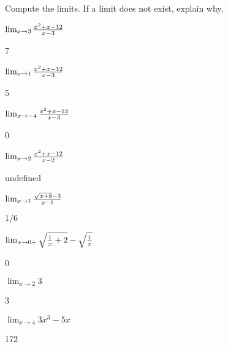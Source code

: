 \begin{exercises}

\noindent Compute the limits. If a limit does not exist, explain why.

\twocol

\begin{exercise} $\lim_{x\to 3}{x^2+x-12\over x-3}$
\begin{answer} 7
\end{answer}\end{exercise}

\begin{exercise} $\lim_{x\to 1}{x^2+x-12\over x-3}$
\begin{answer} 5
\end{answer}\end{exercise}

\begin{exercise} $\lim_{x\to -4}{x^2+x-12\over x-3}$
\begin{answer} 0
\end{answer}\end{exercise}

\begin{exercise} $\lim_{x\to 2} {x^2+x-12\over x-2}$
\begin{answer} undefined
\end{answer}\end{exercise}

\begin{exercise} $\lim_{x\to 1} {\sqrt{x+8}-3\over x-1}$
\begin{answer} $1/6$
\end{answer}\end{exercise}

\begin{exercise} $\lim_{x\to 0+} \sqrt{{1\over x}+2} - \sqrt{1\over x}$
\begin{answer} 0
\end{answer}\end{exercise}

\begin{exercise} $\lim _{x\to 2} 3$
\begin{answer} 3
\end{answer}\end{exercise}

\begin{exercise} $\lim _{x\to 4 } 3x^3 - 5x $
\begin{answer} 172
\end{answer}\end{exercise}


\end{exercises}
